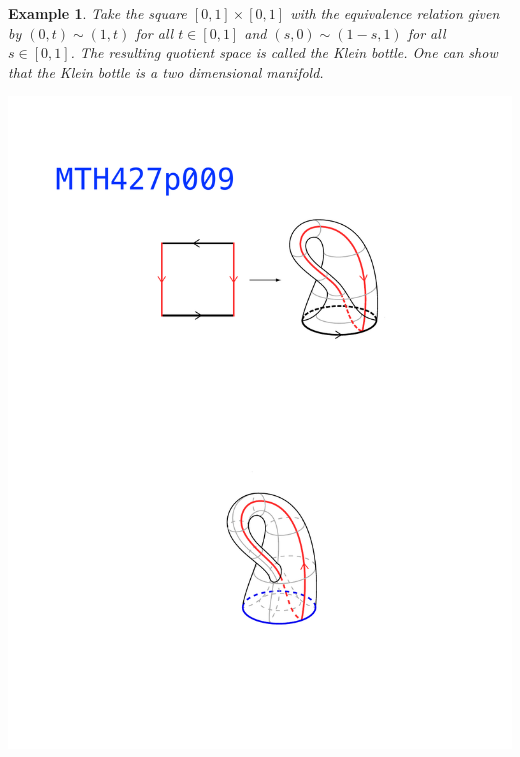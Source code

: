 \documentclass[11pt, letterpaper, oneside]{report}
\theoremstyle{pplain}
\newtheorem{ITERMVALUE THM}[theorem]{Intermediate Value Theorem}
\newtheorem{HEINEBOREL THM}[theorem]{Heine-Borel Theorem}
\newtheorem{UMETR THM}[theorem]{Urysohn Metrization Theorem}
\newtheorem{UMETR2 THM}[theorem]{Urysohn Metrization Theorem (v.2)}
\theoremstyle{ddefinition}
\newtheorem{example}[theorem]{Example}
\theoremstyle{nnn}
\newtheorem{TDA NN}[theorem]{Topological Data Analysis. }
\theoremstyle{eexercise}
\begin{document}
\begin{example}
\label{KLEIN BOTTLE EXAMPLE}
Take the square $[0,1]\times [0,1]$ with the equivalence relation given by $(0,t)\sim (1, t)$
for all $t\in [0,1]$ and $(s, 0)\sim (1-s,1)$ for all $s\in [0,1]$. The resulting quotient space 
is called the \emph{Klein bottle}. One can show that the Klein bottle is a two dimensional manifold. 

{{\includegraphics[width=\textwidth, trim=0mm 176mm 0mm 51mm, clip]{pictures/MTH427p009.pdf}}}   

\end{example}
\end{document}
